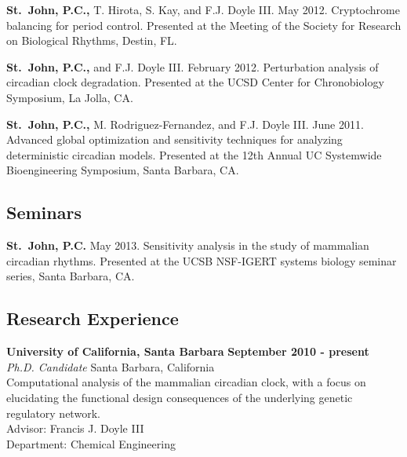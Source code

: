 {%

{\bfseries St.\ John, P.C.,} T. Hirota, S. Kay, and F.J. Doyle III. May 2012. Cryptochrome balancing for period control. Presented at the Meeting of the Society for Research on Biological Rhythms, Destin, FL.

{\bfseries St.\ John, P.C.,} and F.J. Doyle III. February 2012. Perturbation analysis of circadian clock degradation. Presented at the UCSD Center for Chronobiology Symposium, La Jolla, CA.

{\bfseries St.\ John, P.C.,} M. Rodriguez-Fernandez, and F.J. Doyle III.  June 2011. Advanced global optimization and sensitivity techniques for analyzing deterministic circadian models. Presented at the 12th Annual UC Systemwide Bioengineering Symposium, Santa Barbara, CA.





\subsection*{Seminars}
{\bfseries St.\ John, P.C.} May 2013. Sensitivity analysis in the study of
mammalian circadian rhythms. Presented at the UCSB NSF-IGERT systems biology
seminar series, Santa Barbara, CA.

\subsection*{Research Experience}

{\bf University of California, Santa Barbara} \hfill {\bf September 2010 - present}\\
{\em Ph.D. Candidate} \hfill Santa Barbara, California\\
Computational analysis of the mammalian circadian clock, with a focus on
elucidating the functional design consequences of the underlying genetic
regulatory network.\\
Advisor: Francis J. Doyle III \\
Department: Chemical Engineering

}
